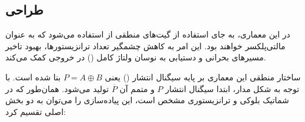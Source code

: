 
\newpage





\newpage

\subsection{
    طراحی
}

در این معماری، به جای استفاده از گیت‌های منطقی از  استفاده می‌شود که به عنوان مالتی‌پلکسر خواهند بود. این امر به کاهش چشمگیر تعداد ترانزیستورها، بهبود تاخیر مسیرهای بحرانی و دستیابی به نوسان ولتاژ کامل () در خروجی کمک می‌کند.


ساختار منطقی این معماری بر پایه سیگنال انتشار () یعنی $P = A \oplus B$ بنا شده است. با توجه به شکل مدار، ابتدا سیگنال انتشار $P$ و متمم آن $\overline{P}$ تولید می‌شود. همان‌طور که در شماتیک بلوکی و ترانزیستوری مشخص است، این پیاده‌سازی را می‌توان به دو بخش اصلی تقسیم کرد:

